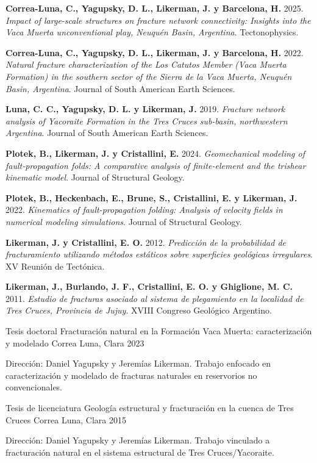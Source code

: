 \documentclass[10pt, a4paper]{awesome-cv}
\begin{document}
\begin{cvparagraph}
\textbf{Correa-Luna, C., Yagupsky, D. L., Likerman, J. y Barcelona, H.} 2025. \emph{Impact of large-scale structures on fracture network connectivity: Insights into the Vaca Muerta unconventional play, Neuquén Basin, Argentina}. Tectonophysics.

\textbf{Correa-Luna, C., Yagupsky, D. L., Likerman, J. y Barcelona, H.} 2022. \emph{Natural fracture characterization of the Los Catutos Member (Vaca Muerta Formation) in the southern sector of the Sierra de la Vaca Muerta, Neuquén Basin, Argentina}. Journal of South American Earth Sciences.

\textbf{Luna, C. C., Yagupsky, D. L. y Likerman, J.} 2019. \emph{Fracture network analysis of Yacoraite Formation in the Tres Cruces sub-basin, northwestern Argentina}. Journal of South American Earth Sciences.

\textbf{Plotek, B., Likerman, J. y Cristallini, E.} 2024. \emph{Geomechanical modeling of fault-propagation folds: A comparative analysis of finite-element and the trishear kinematic model}. Journal of Structural Geology.

\textbf{Plotek, B., Heckenbach, E., Brune, S., Cristallini, E. y Likerman, J.} 2022. \emph{Kinematics of fault-propagation folding: Analysis of velocity fields in numerical modeling simulations}. Journal of Structural Geology.

\textbf{Likerman, J. y Cristallini, E. O.} 2012. \emph{Predicción de la probabilidad de fracturamiento utilizando métodos estáticos sobre superficies geológicas irregulares}. XV Reunión de Tectónica.

\textbf{Likerman, J., Burlando, J. F., Cristallini, E. O. y Ghiglione, M. C.} 2011. \emph{Estudio de fracturas asociado al sistema de plegamiento en la localidad de Tres Cruces, Provincia de Jujuy}. XVIII Congreso Geológico Argentino.
\end{cvparagraph}

\vspace{-2mm}
\begin{cventries}
\cventry
  {Tesis doctoral}
  {Fracturación natural en la Formación Vaca Muerta: caracterización y modelado}
  {Correa Luna, Clara}
  {2023}
  {
    \begin{cvitems}
      \item {Dirección: Daniel Yagupsky y Jeremías Likerman. Trabajo enfocado en caracterización y modelado de fracturas naturales en reservorios no convencionales.}
    \end{cvitems}
  }
\cventry
  {Tesis de licenciatura}
  {Geología estructural y fracturación en la cuenca de Tres Cruces}
  {Correa Luna, Clara}
  {2015}
  {
    \begin{cvitems}
      \item {Dirección: Daniel Yagupsky y Jeremías Likerman. Trabajo vinculado a fracturación natural en el sistema estructural de Tres Cruces/Yacoraite.}
    \end{cvitems}
  }
\end{cventries}
\end{document}
